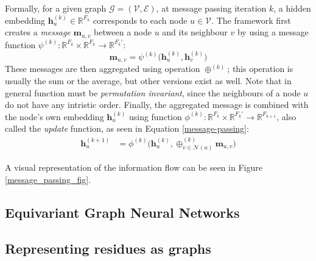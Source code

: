 Formally, for a given graph $\mathcal{G} = (\mathcal{V}, \mathcal{E})$, at message passing iteration $k$, a hidden embedding $\textbf{h}_u^{(k)} \in \mathbb{R}^{F_k}$ corresponds to each node $u \in \mathcal{V}$. 
The framework first creates a \textit{message} $\mathbf{m}_{u,v}$ between a node $u$ and its neighbour $v$ by using a message function $\psi^{(k)}: \mathbb{R}^{F_k}\times\mathbb{R}^{F_k} \rightarrow \mathbb{R}^{F_{k}'}$:
\begin{equation}
    \mathbf{m}_{u, v} = \psi^{(k)}\Big(\textbf{h}_{u}^{(k)}, \textbf{h}_v^{(k)}\Big)
\end{equation}
These messages are then aggregated using operation $\oplus^{(k)}$; 
this operation is usually the sum or the average, but other versions exist as well. Note that in general function must be \textit{permutation invariant}, since the neighbours of a node $u$ do not have any intristic order.
Finally, the aggregated message is combined with the node's own embedding $\mathbf{h}_u^{(k)}$ using function $\phi^{(k)}:\mathbb{R}^{F_k} \times \mathbb{R}^{F_{k}'} \rightarrow \mathbb{R}^{F_{k+1}}$, also called the \textit{update} function, as seen in Equation \ref{message-passing}:
\begin{align}
    \textbf{h}_u^{(k+1)} &= \phi^{(k)}\Big(\textbf{h}_u^{(k)}, \oplus_{v\in \mathcal{N}(u)}^{(k)}\mathbf{m}_{u,v}\Big)
\label{message-passing}
\end{align}

A visual representation of the information flow can be seen in Figure \ref{message_passing_fig}.

\subsection{Equivariant Graph Neural Networks}

\subsection{Representing residues as graphs}
